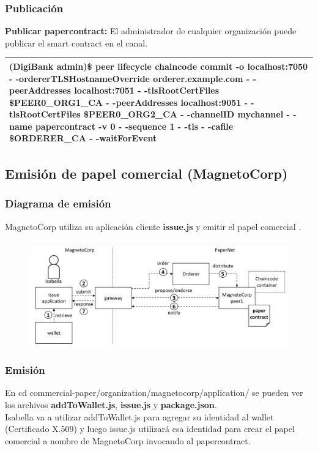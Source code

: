 \documentclass{beamer}
\begin{document}
	\begin{frame}
		\frametitle{Publicación}
		\textbf{Publicar papercontract:} El administrador de cualquier organización puede publicar el smart contract en el canal.\\
		\begin{center}
			\begin{tabulary}{\linewidth}{L}
				\hline
				(DigiBank admin)\$ peer lifecycle chaincode commit -o localhost:7050 - -ordererTLSHostnameOverride orderer.example.com - -peerAddresses localhost:7051 - -tlsRootCertFiles \${PEER0\_ORG1\_CA} - -peerAddresses localhost:9051 - -tlsRootCertFiles \${PEER0\_ORG2\_CA} - -channelID mychannel - -name papercontract -v 0 - -sequence 1 - -tls - -cafile \$ORDERER\_CA - -waitForEvent\\
				\hline
			\end{tabulary} 
		\end{center}
	\end{frame}
	
	\subsection{Emisión de papel comercial (MagnetoCorp)}
	
	\begin{frame}
		\frametitle{Diagrama de emisión}
		MagnetoCorp utiliza su aplicación cliente \textbf{issue.js} y emitir el papel comercial .
		\begin{figure}[h]
			\includegraphics[scale=.4]{papernet_05}
			\centering
		\end{figure}
	\end{frame}
	
	\begin{frame}
		\frametitle{Emisión}
		En cd commercial-paper/organization/magnetocorp/application/ se pueden ver los archivos \textbf{addToWallet.js}, \textbf{issue.js} y \textbf{package.json}.\\
		\vspace{4mm}
		Isabella va a utilizar addToWallet.js para agregar su identidad al wallet (Certificado X.509) y luego issue.js utilizará esa identidad para crear el papel comercial a nombre de MagnetoCorp invocando al papercontract.
	\end{frame}
	
\end{document}
